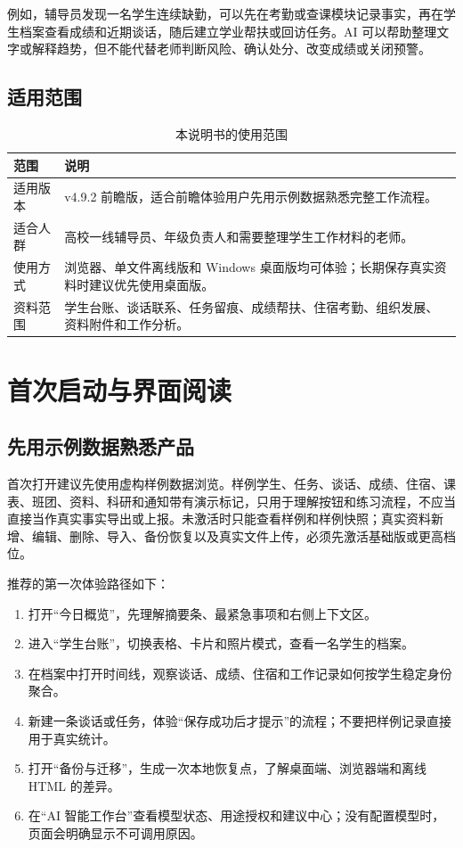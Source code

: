 \documentclass[UTF8,zihao=-4,oneside]{ctexrep}
\begin{document}
例如，辅导员发现一名学生连续缺勤，可以先在考勤或查课模块记录事实，再在学生档案查看成绩和近期谈话，随后建立学业帮扶或回访任务。AI 可以帮助整理文字或解释趋势，但不能代替老师判断风险、确认处分、改变成绩或关闭预警。

\section{适用范围}

\begin{table}[H]
\centering
\caption{本说明书的使用范围}
\begin{tabularx}{\textwidth}{B{30mm} Y}
\toprule
范围 & 说明 \\
\midrule
适用版本 & v4.9.2 前瞻版，适合前瞻体验用户先用示例数据熟悉完整工作流程。 \\
适合人群 & 高校一线辅导员、年级负责人和需要整理学生工作材料的老师。 \\
使用方式 & 浏览器、单文件离线版和 Windows 桌面版均可体验；长期保存真实资料时建议优先使用桌面版。 \\
资料范围 & 学生台账、谈话联系、任务留痕、成绩帮扶、住宿考勤、组织发展、资料附件和工作分析。 \\
\bottomrule
\end{tabularx}
\end{table}

\chapter{首次启动与界面阅读}

\section{先用示例数据熟悉产品}

首次打开建议先使用虚构样例数据浏览。样例学生、任务、谈话、成绩、住宿、课表、班团、资料、科研和通知带有演示标记，只用于理解按钮和练习流程，不应当直接当作真实事实导出或上报。未激活时只能查看样例和样例快照；真实资料新增、编辑、删除、导入、备份恢复以及真实文件上传，必须先激活基础版或更高档位。

推荐的第一次体验路径如下：

\begin{enumerate}
  \item 打开“今日概览”，先理解摘要条、最紧急事项和右侧上下文区。
  \item 进入“学生台账”，切换表格、卡片和照片模式，查看一名学生的档案。
  \item 在档案中打开时间线，观察谈话、成绩、住宿和工作记录如何按学生稳定身份聚合。
  \item 新建一条谈话或任务，体验“保存成功后才提示”的流程；不要把样例记录直接用于真实统计。
  \item 打开“备份与迁移”，生成一次本地恢复点，了解桌面端、浏览器端和离线 HTML 的差异。
  \item 在“AI 智能工作台”查看模型状态、用途授权和建议中心；没有配置模型时，页面会明确显示不可调用原因。
\end{enumerate}
\end{document}
